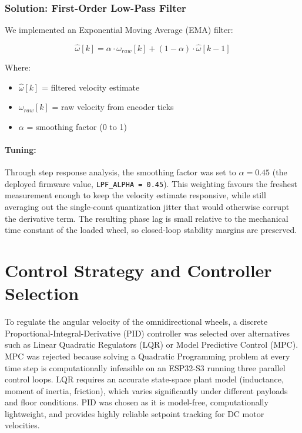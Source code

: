 \subsubsection{Solution: First-Order Low-Pass Filter}

We implemented an Exponential Moving Average (EMA) filter:

\begin{equation}
\hat{\omega}[k] = \alpha \cdot \omega_{raw}[k] + (1-\alpha) \cdot \hat{\omega}[k-1]
\label{eq:lowpass_filter}
\end{equation}

Where:
\begin{itemize}
    \item $\hat{\omega}[k]$ = filtered velocity estimate
    \item $\omega_{raw}[k]$ = raw velocity from encoder ticks
    \item $\alpha$ = smoothing factor (0 to 1)
\end{itemize}

\paragraph{Tuning:} Through step response analysis, the smoothing factor was set to $\alpha = 0.45$ (the deployed firmware value, \texttt{LPF\_ALPHA = 0.45}). This weighting favours the freshest measurement enough to keep the velocity estimate responsive, while still averaging out the single-count quantization jitter that would otherwise corrupt the derivative term. The resulting phase lag is small relative to the mechanical time constant of the loaded wheel, so closed-loop stability margins are preserved.


\newpage
\section{Control Strategy and Controller Selection}
\label{sec:control_strategy}

To regulate the angular velocity of the omnidirectional wheels, a discrete Proportional-Integral-Derivative (PID) controller was selected over alternatives such as Linear Quadratic Regulators (LQR) or Model Predictive Control (MPC). MPC was rejected because solving a Quadratic Programming problem at every time step is computationally infeasible on an ESP32-S3 running three parallel control loops. LQR requires an accurate state-space plant model (inductance, moment of inertia, friction), which varies significantly under different payloads and floor conditions. PID was chosen as it is model-free, computationally lightweight, and provides highly reliable setpoint tracking for DC motor velocities.

